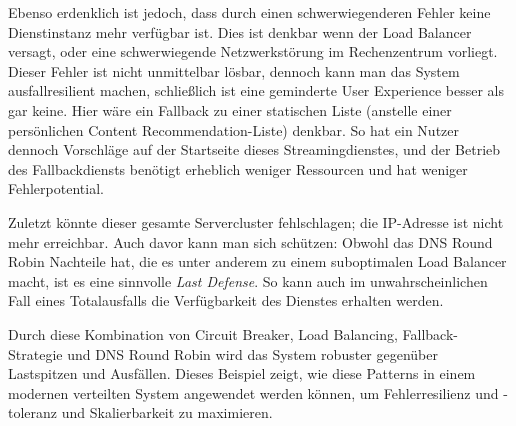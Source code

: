 Ebenso erdenklich ist jedoch, dass durch einen schwerwiegenderen Fehler keine Dienstinstanz mehr verfügbar ist. Dies ist denkbar wenn der Load Balancer versagt, oder eine schwerwiegende Netzwerkstörung im Rechenzentrum vorliegt. Dieser Fehler ist nicht unmittelbar lösbar, dennoch kann man das System ausfallresilient machen, schließlich ist eine geminderte User Experience besser als gar keine. Hier wäre ein Fallback zu einer statischen Liste (anstelle einer persönlichen Content Recommendation-Liste) denkbar. So hat ein Nutzer dennoch Vorschläge auf der Startseite dieses Streamingdienstes, und der Betrieb des Fallbackdiensts benötigt erheblich weniger Ressourcen und hat weniger Fehlerpotential.

Zuletzt könnte dieser gesamte Servercluster fehlschlagen; die IP-Adresse ist nicht mehr erreichbar. Auch davor kann man sich schützen: Obwohl das DNS Round Robin Nachteile hat, die es unter anderem zu einem suboptimalen Load Balancer macht, ist es eine sinnvolle \textit{Last Defense}. So kann auch im unwahrscheinlichen Fall eines Totalausfalls die Verfügbarkeit des Dienstes erhalten werden.

Durch diese Kombination von Circuit Breaker, Load Balancing, Fallback-Strategie und DNS Round Robin wird das System robuster gegenüber Lastspitzen und Ausfällen. Dieses Beispiel zeigt, wie diese Patterns in einem modernen verteilten System angewendet werden können, um Fehlerresilienz und -toleranz und Skalierbarkeit zu maximieren.

